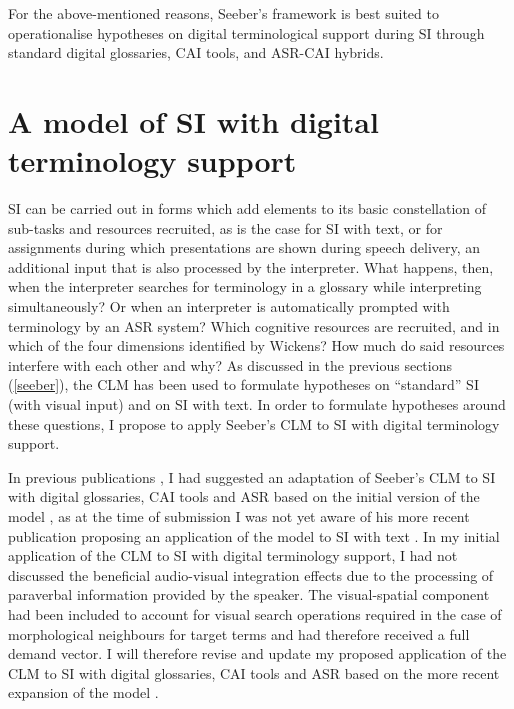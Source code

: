 For the above-mentioned reasons, Seeber's framework is best suited to operationalise hypotheses on digital terminological support during SI through standard digital glossaries, CAI tools, and ASR-CAI hybrids.
\section{A model of SI with digital terminology support} \label{mymodel}
SI can be carried out in forms which add elements to its basic constellation of sub-tasks and resources recruited, as is the case for SI with text, or for assignments during which presentations are shown during speech delivery, an additional input that is also processed by the interpreter. What happens, then, when the interpreter searches for terminology in a glossary while interpreting simultaneously? Or when an interpreter is automatically prompted with terminology by an ASR system? Which cognitive resources are recruited, and in which of the four dimensions identified by Wickens? How much do said resources interfere with each other and why? As discussed in the previous sections (\ref{seeber}), the CLM has been used to formulate hypotheses on ``standard'' SI (with visual input) and on SI with text. In order to formulate hypotheses around these questions, I propose to apply Seeber's CLM to SI with digital terminology support.



In previous publications \citep{prandi_designing_2017,prandi_exploratory_2018}, I had suggested an adaptation of Seeber's CLM to SI with digital glossaries, CAI tools and ASR based on the initial version of the model \citep{seeber_thinking_2007,seeber_cognitive_2011,seeber_cognitive_2012}, as at the time of submission I was not yet aware of his more recent publication proposing an application of the model to SI with text \citep{seeber_multimodal_2017}. In my initial application of the CLM to SI with digital terminology support, I had not discussed the beneficial audio-visual integration effects due to the processing of paraverbal information provided by the speaker. The visual-spatial component had been included to account for visual search operations required in the case of morphological neighbours for target terms \citep{prandi_exploratory_2018} and had therefore received a full demand vector. I will therefore revise and update my proposed application of the CLM to SI with digital glossaries, CAI tools and ASR based on the more recent expansion of the model \citep{seeber_multimodal_2017}.
